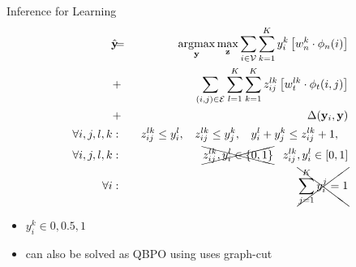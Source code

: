 \documentclass{beamer}
\DeclareMathOperator*{\argmax}{argmax}
\newcommand{\y}{{\mathbf y}}     %
\newcommand{\ysc}[2]{{y_{#1}^{#2}}}    %
\newcommand{\zsc}[2]{{z_{#1}^{#2}}}    %
\newcommand{\fn}[1]{{\phi_n(#1)}}      %
\newcommand{\fe}[3]{{\phi_{#1}(#2,#3)}}%
\newcommand{\wn}[1]{{w_n^{#1}}}        %
\newcommand{\we}[3]{{w_{#1}^{#2#3}}}   %
\newcommand{\loss}[2]{{\Delta(#1,#2)}}   %
\begin{document}

\begin{frame}{Inference for Learning}
 \begin{eqnarray*}
\hat{\y}\!\!\!&=&\!\!\!\argmax_{\y}\max_{\mathbf z} \sum_{i \in \mathcal{V}} \sum_{k=1}^{K} \ysc{i}{k} \left[\wn{k} \cdot \fn{i} \right] \\
&+&  \!\!\!\sum_{(i,j)\in \mathcal{E}}  \sum_{l=1}^{K}  \sum_{k=1}^{K}  \zsc{ij}{lk} \left[\we{t}{l}{k} \cdot \fe{t}{i}{j}\right] \\
&+& \loss{\y_i}{\y} \label{eq:relaxobj}\\
\forall i,j,l,k &:& \:\: \zsc{ij}{lk}\le \ysc{i}{l}, \:\:\:\:
\zsc{ij}{lk}\le \ysc{j}{k},\:\:\:\:
\ysc{i}{l} + \ysc{j}{k} \le \zsc{ij}{lk}+1,\:\:\:\: \\
\forall i,j,l,k &:& \xcancel{ \zsc{ij}{lk},\ysc{i}{l} \in \{ 0,1 \} } \;\;\; \zsc{ij}{lk},\ysc{i}{l} \in [ 0,1 ] \\
\forall i &:& \xcancel{\sum_{j=1}^{K} y_i^j = 1 }
\end{eqnarray*} 

\begin{itemize}
 \item $y_i^k\in{0,0.5,1}$
 \item can also be solved as QBPO using uses graph-cut
\end{itemize}

\end{frame}
\end{document}
